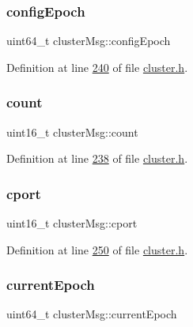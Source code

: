 \subsubsection{\texorpdfstring{config\+Epoch}{configEpoch}}
{\footnotesize\ttfamily uint64\+\_\+t cluster\+Msg\+::config\+Epoch}



Definition at line \hyperlink{cluster_8h_source_l00240}{240} of file \hyperlink{cluster_8h_source}{cluster.\+h}.

\mbox{\label{structclusterMsg_aba0776aac818854ae51ee0ed428d766b}} 
\subsubsection{\texorpdfstring{count}{count}}
{\footnotesize\ttfamily uint16\+\_\+t cluster\+Msg\+::count}



Definition at line \hyperlink{cluster_8h_source_l00238}{238} of file \hyperlink{cluster_8h_source}{cluster.\+h}.

\mbox{\label{structclusterMsg_a330ad2b74be19fa8130b5e5920d8c9fc}} 
\subsubsection{\texorpdfstring{cport}{cport}}
{\footnotesize\ttfamily uint16\+\_\+t cluster\+Msg\+::cport}



Definition at line \hyperlink{cluster_8h_source_l00250}{250} of file \hyperlink{cluster_8h_source}{cluster.\+h}.

\mbox{\label{structclusterMsg_af587c060955ca4028c33087afaaceca4}} 
\subsubsection{\texorpdfstring{current\+Epoch}{currentEpoch}}
{\footnotesize\ttfamily uint64\+\_\+t cluster\+Msg\+::current\+Epoch}



